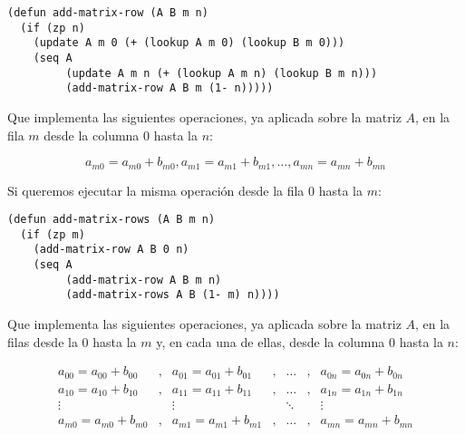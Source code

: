 \documentclass[a4paper,10pt]{article}
\begin{document}
\par \vspace{10pt}

\begin{lstlisting}[language=clips]
(defun add-matrix-row (A B m n)
  (if (zp n)
    (update A m 0 (+ (lookup A m 0) (lookup B m 0)))
    (seq A
         (update A m n (+ (lookup A m n) (lookup B m n)))
         (add-matrix-row A B m (1- n)))))
\end{lstlisting}

\par \vspace{10pt}

Que implementa las siguientes operaciones, ya aplicada sobre la matriz $A$, en la fila $m$ desde la columna 0 hasta la $n$:

\par \vspace{10pt}

$$
a_{m0} = a_{m0} + b_{m0},a_{m1} = a_{m1} + b_{m1},\dots,a_{mn} = a_{mn} + b_{mn}
$$

\par \vspace{10pt}

Si queremos ejecutar la misma operación desde la fila 0 hasta la $m$:

\par \vspace{10pt}

\begin{lstlisting}[language=clips]
(defun add-matrix-rows (A B m n)
  (if (zp m)
    (add-matrix-row A B 0 n)
    (seq A
         (add-matrix-row A B m n)
         (add-matrix-rows A B (1- m) n))))
\end{lstlisting}

\par \vspace{10pt}

Que implementa las siguientes operaciones, ya aplicada sobre la matriz $A$, en la filas desde la 0 hasta la $m$ y, en cada una de ellas, desde la columna 0 hasta la $n$:

\par \vspace{10pt}

$$
\begin{array}{ccccccccc}
a_{00} = a_{00} + b_{00} & , & a_{01} = a_{01} + b_{01} & , & \dots & , & a_{0n} = a_{0n} + b_{0n} \\
a_{10} = a_{10} + b_{10} & , & a_{11} = a_{11} + b_{11} & , & \dots & , & a_{1n} = a_{1n} + b_{1n} \\
\vdots & & \vdots & & \ddots & & \vdots\\
a_{m0} = a_{m0} + b_{m0} & , & a_{m1} = a_{m1} + b_{m1} & , & \dots & , & a_{mn} = a_{mn} + b_{mn} \\
\end{array}
$$
\end{document}
